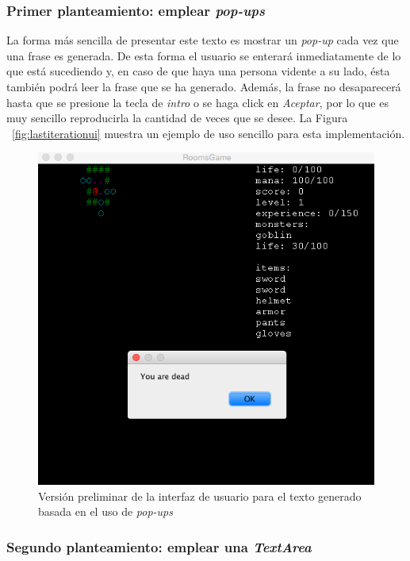 \subsubsection{Primer planteamiento: emplear \textit{pop-ups}}

La forma más sencilla de presentar este texto es mostrar un \emph{pop-up} cada vez que una frase es generada. De esta forma el usuario se enterará inmediatamente de lo que está sucediendo y, en caso de que haya una persona vidente a su lado, ésta también podrá leer la frase que se ha generado. Además, la frase no desaparecerá hasta que se presione la tecla de \textit{intro} o se haga click en \textit{Aceptar}, por lo que es muy sencillo reproducirla la cantidad de veces que se desee. La Figura ~\ref{fig:lastiterationui} muestra un ejemplo de uso sencillo para esta implementación.

\begin{figure}
    \includegraphics[width=\textwidth,height=\textheight,keepaspectratio]{./img/firstiterationui.png}
  \caption{Versión preliminar de la interfaz de usuario para el texto generado basada en el uso de \textit{pop-ups}}
  \label{fig:firstiterationui}
\end{figure}

\subsubsection{Segundo planteamiento: emplear una \textit{TextArea}}

